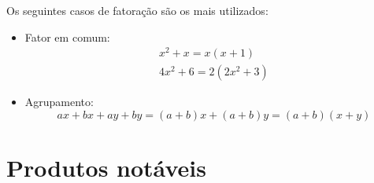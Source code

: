  Os seguintes casos de fatoração são os mais utilizados:
 \begin{itemize}
  \item Fator em comum: 
 \begin{gather*}
   x^2 + x= x(x + 1) \\
   4x^2 + 6= 2(2x^2 + 3)
 \end{gather*}
  
  \item Agrupamento:
 \begin{equation*}
   ax + bx + ay + by= (a+b)x+(a+b)y= (a+b)(x+y)
 \end{equation*}
\end{itemize}
  
 \section{Produtos notáveis}

